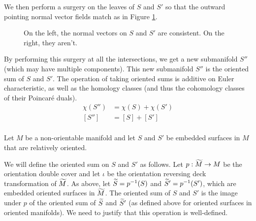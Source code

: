 We then perform a surgery on the leaves of $S$ and $S'$ so that the outward pointing normal vector fields match as in Figure \ref{fig:surgery}.%
\begin{figure}
  \centering
  \caption{On the left, the normal vectors on $S$ and $S'$ are consistent. On the right, they aren't.}
  \label{fig:surgery}
\end{figure}

By performing this surgery at all the intersections, we get a new submanifold $S''$ (which may have
multiple components). This new submanifold $S''$ is the oriented sum of $S$ and $S'$. The operation
of taking oriented sums is additive on Euler characteristic, as well as the homology classes (and thus
the cohomology classes of their Poincar\'e duals).
\begin{align*}
  \chi(S'') &= \chi(S) + \chi(S') \\
  [S''] &= [S] + [S'] \\
\end{align*}

Let $M$ be a non-orientable manifold and let $S$ and $S'$ be embedded surfaces in $M$ that are relatively oriented.

We will define the oriented sum on $S$ and $S'$ as follows.  Let $p:\widetilde{M}\rightarrow M$ be the orientation double cover and let $\iota$ be the orientation reversing deck transformation of $\widetilde{M}$.  As above, let $\widetilde{S}=p^{-1}(S)$ and $\widetilde{S}'=p^{-1}(S')$, which are embedded oriented surfaces in $\widetilde{M}$.  The oriented sum of $S$ and $S'$ is the image under $p$ of the oriented sum of $\widetilde{S}$ and $\widetilde{S}'$ (as defined above for oriented surfaces in oriented manifolds).  We need to justify that this operation is well-defined.

